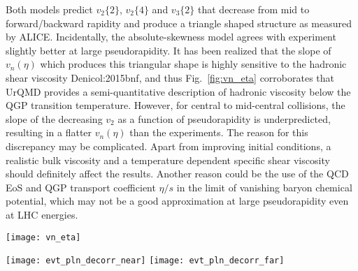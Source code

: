 Both models predict $v_2\{2\}$, $v_2\{4\}$ and $v_3\{2\}$ that decrease from mid to forward/backward rapidity and produce a triangle shaped structure as measured by ALICE.
Incidentally, the absolute-skewness model agrees with experiment slightly better at large pseudorapidity.
It has been realized that the slope of $v_n(\eta)$ which produces this triangular shape is highly sensitive to the hadronic shear viscosity {Denicol:2015bnf}, and thus Fig.~\ref{fig:vn_eta} corroborates that UrQMD provides a semi-quantitative description of hadronic viscosity below the QGP transition temperature.
However, for central to mid-central collisions, the slope of the decreasing $v_2$ as a function of pseudorapidity is underpredicted, resulting in a flatter $v_n(\eta)$ than the experiments.
The reason for this discrepancy may be complicated.
Apart from improving initial conditions, a realistic bulk viscosity and a temperature dependent specific shear viscosity should definitely affect the results.
Another reason could be the use of the QCD EoS and QGP transport coefficient $\eta/s$ in the limit of vanishing baryon chemical potential, which may not be a good approximation at large pseudorapidity even at LHC energies.

\begin{figure*}
  \texttt{[image: vn\_eta]}
  \caption{Pseudorapidity dependence of anisotropic flow coefficients $v_2\{2\}$, $v_3\{2\}$ and $v_2\{4\}$ (blue circle, green triangle and orange diamond shaped symbols) calculated from the hybrid model with constant specific shear viscosity $\eta/s=0.25$ and $0.28$ for relative- and absolute-skewness models respectively (solid and open symbols), compared to data from ALICE (smaller black symbols) with $p_T > 0$~GeV (extrapolated) in different centrality bins. 
  The bands for each theory calculation point indicate $1\sigma$ statistical error, while experimental bands/bars denote $1\sigma$ systematic and statistical errors respectively.}
  \label{fig:vn_eta}
\end{figure*}



\begin{figure*}
  \begin{center}
  \texttt{[image: evt\_pln\_decorr\_near]}
  \quad\quad\quad
  \texttt{[image: evt\_pln\_decorr\_far]}
  \end{center}
  \caption{Left: The event-plane decorrelation for $n=2,3$ in different centrality bins with the reference particles from $3.0<|\eta^b|<4.0$.
  Right: The same quantities as the left panel but with the reference particles from $4.4<|\eta^b|<5.0$. 
  Theory bands indicate $1\sigma$ statistical error, while experimental bands/bars denote $1\sigma$ systematic and statistical errors respectively.}
  \label{fig:epd}
\end{figure*}


